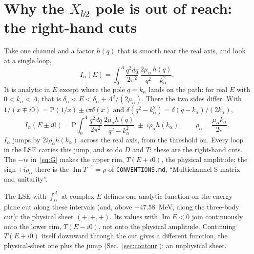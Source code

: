 \documentclass[11pt]{article}
\newcommand{\file}[1]{\nolinkurl{#1}}
\begin{document}
\section{Why the \texorpdfstring{$X_{b2}$}{Xb2} pole is out of reach: the right-hand cuts}\label{sec:rhc}

Take one channel and a factor $h(q)$ that is smooth near the real axis, and look at a single loop,
\begin{equation}\label{eq:loop}
I_\alpha(E)=\int_0^\Lambda\frac{q^2dq}{2\pi^2}\,\frac{2\mu_\alpha\,h(q)}{q^2-k_\alpha^2}.
\end{equation}
It is analytic in $E$ except where the pole $q=k_\alpha$ lands on the path: for real $E$ with $0<k_\alpha<\Lambda$, that is $\delta_\alpha<E<\delta_\alpha+\Lambda^2/(2\mu_\alpha)$. There the two sides differ. With $1/(x\mp i0)=\mathrm P(1/x)\pm i\pi\delta(x)$ and $\delta(q^2-k_\alpha^2)=\delta(q-k_\alpha)/(2k_\alpha)$,
\begin{equation}\label{eq:jump}
I_\alpha(E\pm i0)=\mathrm P\!\!\int_0^\Lambda\frac{q^2dq}{2\pi^2}\,\frac{2\mu_\alpha h(q)}{q^2-k_\alpha^2}\;\pm\;i\rho_\alpha h(k_\alpha),\qquad \rho_\alpha=\frac{\mu_\alpha k_\alpha}{2\pi}.
\end{equation}
$I_\alpha$ jumps by $2i\rho_\alpha h(k_\alpha)$ across the real axis, from the threshold on. Every loop in the LSE carries this jump, and so do $D$ and $T$: these are the right-hand cuts. The $-i\epsilon$ in~\eqref{eq:G} makes the upper rim, $T(E+i0)$, the physical amplitude; the sign $+i\rho_\alpha$ there is the $\operatorname{Im}T^{-1}=\rho$ of \file{CONVENTIONS.md}, ``Multichannel S matrix and unitarity''.

The LSE with $\int_0^\Lambda$ at complex $E$ defines one analytic function on the energy plane cut along these intervals (and, above $+47.58$~MeV, along the three-body cut): the physical sheet $(+,+,+)$. Its values with $\operatorname{Im}E<0$ join continuously onto the lower rim, $T(E-i0)$, not onto the physical amplitude. Continuing $T(E+i0)$ itself downward through the cut gives a different function, the physical-sheet one plus the jump (Sec.~\ref{sec:contour}): an unphysical sheet.
\end{document}
